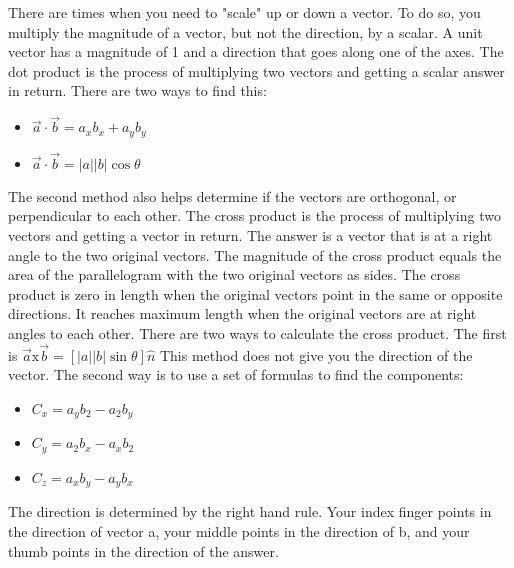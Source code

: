 \documentclass[../em.tex]{subfiles}
\begin{document}
\smallbreak
There are times when you need to "scale" up or down a vector. To do so, you multiply the magnitude of a vector, but not the direction, by a scalar.
\smallbreak
A unit vector has a magnitude of 1 and a direction that goes along one of the axes. 
\smallbreak
The dot product is the process of multiplying two vectors and getting a scalar answer in return. There are two ways to find this:
\begin{itemize}
    \item $\vec{a}\cdot \vec{b} = a_xb_x+a_yb_y$
    \item $\vec{a}\cdot \vec{b} = |a||b|\cos \theta$
\end{itemize}
The second method also helps determine if the vectors are orthogonal, or perpendicular to each other.\smallbreak
The cross product is the process of multiplying two vectors and getting a vector in return. The answer is a vector that is at a right angle to the two original vectors. The magnitude of the cross product equals the area of the parallelogram with the two original vectors as sides.
\smallbreak
The cross product is zero in length when the original vectors point in the same or opposite directions. It reaches maximum length when the original vectors are at right angles to each other.
\smallbreak
There are two ways to calculate the cross product.\smallbreak
The first is $\vec{a} \text{x} \vec{b} = [|a||b|\sin \theta]\hat{n}$
\smallbreak
This method does not give you the direction of the vector.
\smallbreak
The second way is to use a set of formulas to find the components:
\begin{itemize}
    \item $C_x=a_yb_2-a_2b_y$
    \item $C_y=a_2b_x-a_xb_2$
    \item $C_z=a_xb_y-a_yb_x$
\end{itemize}
The direction is determined by the right hand rule. Your index finger points in the direction of vector a, your middle points in the direction of b, and your thumb points in the direction of the answer.
\end{document}
